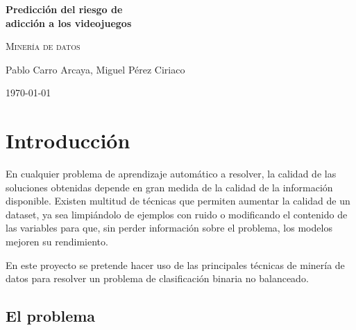 \documentclass{article}
\newcommand{\eltitulo}{Predicción del riesgo de\\ adicción a los videojuegos}
\newcommand{\elautor}{Pablo Carro Arcaya, Miguel Pérez Ciriaco}
\newcommand{\lafecha}{\today}
\begin{document}
\begin{titlepage}
    \centering

    \vspace*{\fill}
    
    \vspace{1cm}
    \vspace{1.5cm}

    {\Huge\bfseries \eltitulo \par}
    
    \vspace{1cm}

    \vspace{2cm}

        {\Large
    \textsc{Minería de datos}\par}
    \vspace{1cm}

    {\large
    \elautor\par}

    \vspace{2cm}

    {\large \lafecha \par}

    \vspace*{\fill}

\end{titlepage}

\tableofcontents
\pagebreak

\section{Introducción}

En cualquier problema de aprendizaje automático a resolver, la calidad de las soluciones obtenidas depende en gran medida de la calidad de la información disponible.
Existen multitud de técnicas que permiten aumentar la calidad de un dataset, ya sea limpiándolo de ejemplos con ruido o modificando el contenido
de las variables para que, sin perder información sobre el problema, los modelos mejoren su rendimiento.\newline

En este proyecto se pretende hacer uso de las principales técnicas de minería de datos para resolver un problema de clasificación binaria no balanceado.

\subsection{El problema}
\end{document}
